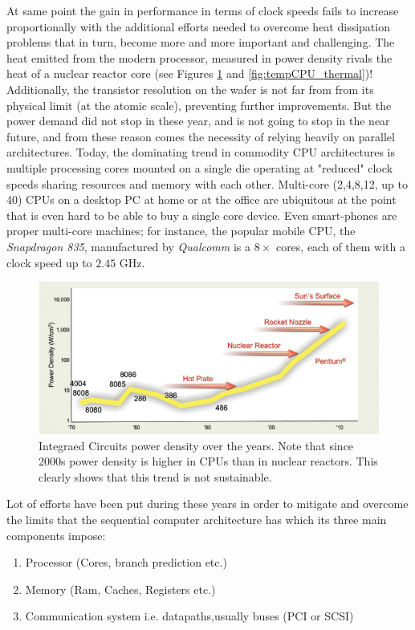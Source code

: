 At same point the gain in performance in terms of clock speeds fails to increase proportionally with the additional efforts needed to overcome heat dissipation problems that in turn, become more and more important and challenging.
The heat emitted from the modern processor, measured in power density rivals the heat of a nuclear reactor core (see Figures \ref{fig:tempCPU} and \ref{fig:tempCPU_thermal})!
Additionally, the transistor resolution on the wafer is not far from from its physical limit (at the atomic scale), preventing further improvements.
But the power demand did not stop in these year, and is not going to stop in the near future, and from these reason comes the necessity of relying heavily on parallel architectures.
Today, the dominating trend in commodity CPU architectures is multiple processing cores mounted on a single die operating at "reduced" clock speeds  sharing resources and memory with each other.
Multi-core (2,4,8,12, up to 40) CPUs on a desktop PC at home or at the office are ubiquitous at the point that is even hard to be able to buy a single core device.
Even smart-phones are proper multi-core machines; for instance, the popular mobile CPU, the \textit{Snapdragon 835}, manufactured by \textit{Qualcomm} is a $8 \times$ cores, each of them with a clock speed up to $2.45$ \si{GHz}.
\begin{figure}[!htbp]
\centering
\includegraphics[width=1.0\textwidth]{./images/parallel_programming/temperatureCPU}
\caption[Temperature density of CPUs over the years.]{Integraed Circuits power density over the years. Note  that since 2000s power density is higher in CPUs than in nuclear reactors. This clearly shows that this trend is not sustainable.}
\label{fig:tempCPU}
\end{figure}
Lot of efforts have been put during these years in order to mitigate and overcome the limits that the sequential computer architecture has which its three main components impose:
\begin{enumerate}
\item Processor (Cores, branch prediction etc.)
\item Memory (Ram, Caches, Registers etc.)
\item Communication system i.e. datapaths,usually buses (PCI or SCSI)
\end{enumerate}
